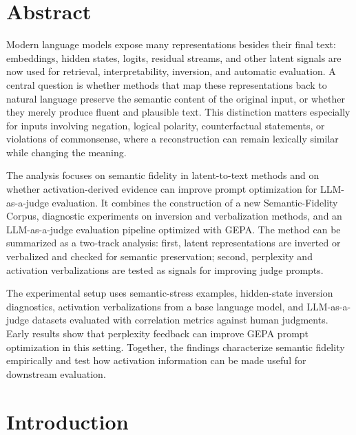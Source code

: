 \documentclass[12pt,a4paper,twoside,openright]{book}
\begin{document}
\frontmatter

\maketitle

\chapter*{Abstract}

Modern language models expose many representations besides their final text:
embeddings, hidden states, logits, residual streams, and other latent signals
are now used for retrieval, interpretability, inversion, and automatic
evaluation. A central question is whether methods that map these
representations back to natural language preserve the semantic content of the
original input, or whether they merely produce fluent and plausible text. This
distinction matters especially for inputs involving negation, logical polarity,
counterfactual statements, or violations of commonsense, where a reconstruction
can remain lexically similar while changing the meaning.

The analysis focuses on semantic fidelity in latent-to-text methods and on
whether activation-derived evidence can improve prompt optimization for
LLM-as-a-judge evaluation. It combines the construction of a new
Semantic-Fidelity Corpus, diagnostic experiments on inversion and verbalization
methods, and an LLM-as-a-judge evaluation pipeline optimized with GEPA. The method
can be summarized as a two-track analysis: first, latent representations are
inverted or verbalized and checked for semantic preservation; second,
perplexity and activation verbalizations are tested as signals for improving
judge prompts.

The experimental setup uses semantic-stress examples, hidden-state inversion
diagnostics, activation verbalizations from a base language model, and
LLM-as-a-judge datasets evaluated with correlation metrics against human
judgments. Early results show that perplexity feedback can improve GEPA prompt
optimization in this setting. Together, the findings characterize semantic
fidelity empirically and test how activation information can be made useful for
downstream evaluation.

\chapter*{Introduction}
\end{document}
